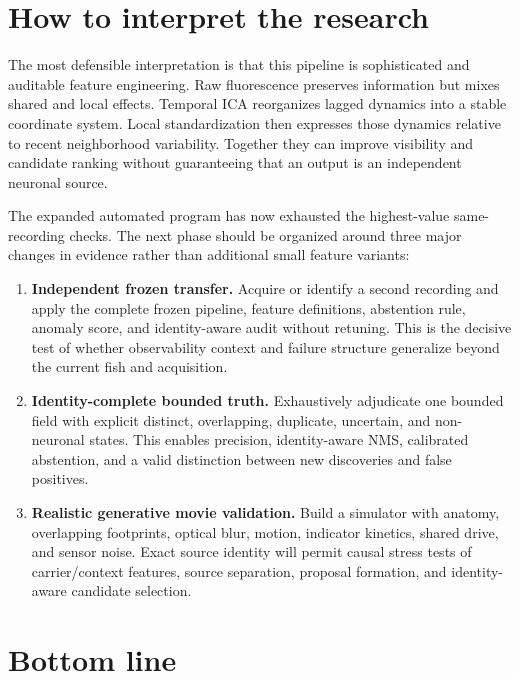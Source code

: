 \section{How to interpret the research}

The most defensible interpretation is that this pipeline is sophisticated and
auditable feature engineering. Raw fluorescence preserves information but mixes
shared and local effects. Temporal ICA reorganizes lagged dynamics into a
stable coordinate system. Local standardization then expresses those dynamics
relative to recent neighborhood variability. Together they can improve
visibility and candidate ranking without guaranteeing that an output is an
independent neuronal source.

The expanded automated program has now exhausted the highest-value
same-recording checks. The next phase should be organized around three major
changes in evidence rather than additional small feature variants:

\begin{enumerate}
  \item \textbf{Independent frozen transfer.} Acquire or identify a second
  recording and apply the complete frozen pipeline, feature definitions,
  abstention rule, anomaly score, and identity-aware audit without retuning.
  This is the decisive test of whether observability context and failure
  structure generalize beyond the current fish and acquisition.
  \item \textbf{Identity-complete bounded truth.} Exhaustively adjudicate one
  bounded field with explicit distinct, overlapping, duplicate, uncertain, and
  non-neuronal states. This enables precision, identity-aware NMS, calibrated
  abstention, and a valid distinction between new discoveries and false
  positives.
  \item \textbf{Realistic generative movie validation.} Build a simulator with
  anatomy, overlapping footprints, optical blur, motion, indicator kinetics,
  shared drive, and sensor noise. Exact source identity will permit causal
  stress tests of carrier/context features, source separation, proposal
  formation, and identity-aware candidate selection.
\end{enumerate}

\section{Bottom line}

